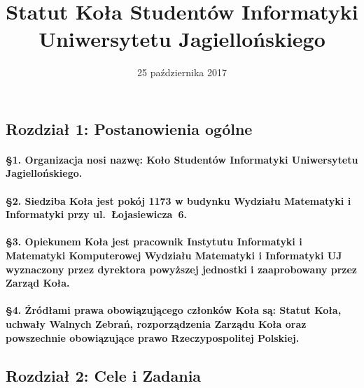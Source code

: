 \documentclass{article}
\title{Statut Koła Studentów Informatyki Uniwersytetu Jagiellońskiego}
\date{25 października 2017}
\begin{document}
\maketitle

\vspace{0.2cm}
\begin{center}
    \section*{Rozdział 1: Postanowienia ogólne}
\end{center}\vspace{0.4cm}
	\paragraph{\S 1. Organizacja nosi nazwę: Koło Studentów Informatyki Uniwersytetu Jagiellońskiego.}
	\paragraph{\S 2. Siedziba Koła jest pokój 1173 w budynku Wydziału Matematyki i Informatyki przy
\mbox{ul. Łojasiewicza~6.}}
	\paragraph{\S 3. Opiekunem Koła jest pracownik Instytutu Informatyki i Matematyki Komputerowej Wydziału Matematyki i Informatyki UJ
         wyznaczony przez dyrektora powyższej jednostki i zaaprobowany przez Zarząd Koła.
        }
	\paragraph{\S 4. Źródłami prawa obowiązującego członków Koła są: Statut Koła, uchwały Walnych Zebrań, rozporządzenia Zarządu Koła oraz
         powszechnie obowiązujące prawo Rzeczypospolitej Polskiej.
        }

\begin{center}\vspace{0.4cm}
    \section*{Rozdział 2: Cele i Zadania}
\end{center}\vspace{0.4cm}
\end{document}

